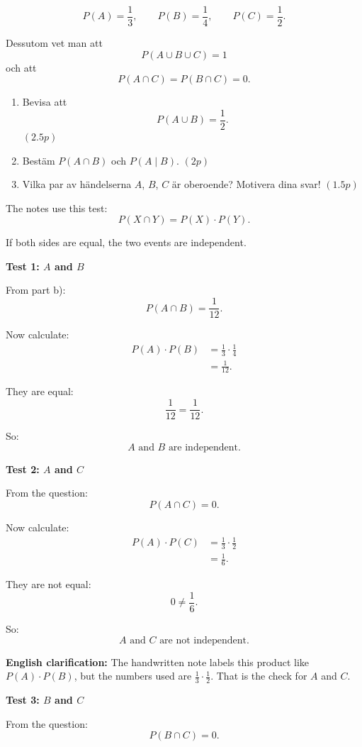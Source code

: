 \documentclass[10pt]{article}
\begin{document}
\[
P(A)=\frac{1}{3},
\qquad
P(B)=\frac{1}{4},
\qquad
P(C)=\frac{1}{2}.
\]

Dessutom vet man att
\[
P(A\cup B\cup C)=1
\]
och att
\[
P(A\cap C)=P(B\cap C)=0.
\]

\begin{enumerate}[label=\alph*)]
\item Bevisa att
\[
P(A\cup B)=\frac{1}{2}.
\]
\hfill \((2.5p)\)

\item Bestäm \(P(A\cap B)\) och \(P(A\mid B)\).
\hfill \((2p)\)

\item Vilka par av händelserna \(A\), \(B\), \(C\)
är oberoende? Motivera dina svar!
\hfill \((1.5p)\)
\end{enumerate}

The notes use this test:
\[
P(X\cap Y)
=
P(X)\cdot P(Y).
\]

If both sides are equal, the two events are
independent.

\textbf{Test 1: \(A\) and \(B\)}

From part b):
\[
P(A\cap B)=\frac{1}{12}.
\]

Now calculate:
\begin{align*}
P(A)\cdot P(B)
&=
\frac{1}{3}\cdot\frac{1}{4}
\\[2mm]
&=
\frac{1}{12}.
\end{align*}

They are equal:
\[
\frac{1}{12}=\frac{1}{12}.
\]

So:
\[
A \text{ and } B
\text{ are independent.}
\]

\textbf{Test 2: \(A\) and \(C\)}

From the question:
\[
P(A\cap C)=0.
\]

Now calculate:
\begin{align*}
P(A)\cdot P(C)
&=
\frac{1}{3}\cdot\frac{1}{2}
\\[2mm]
&=
\frac{1}{6}.
\end{align*}

They are not equal:
\[
0\ne \frac{1}{6}.
\]

So:
\[
A \text{ and } C
\text{ are not independent.}
\]

\textbf{English clarification:}
The handwritten note labels this product like
\(P(A)\cdot P(B)\), but the numbers used are
\(\frac13\cdot\frac12\). That is the check for
\(A\) and \(C\).

\textbf{Test 3: \(B\) and \(C\)}

From the question:
\[
P(B\cap C)=0.
\]
\end{document}
